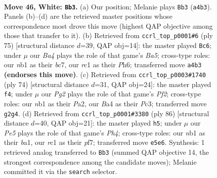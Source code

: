 \documentclass[11pt]{article}
\begin{document}
\clearpage

\begin{figure}[p]\centering
\begin{subfigure}{0.46\textwidth}\centering
\resizebox{\linewidth}{!}{%
\newchessgame
\chessboard[
  setfen={6k1/1b3p1p/6p1/4Pp2/B4P2/7N/P4KPP/1nr5 w - - 0 46},
  showmover=false,
  pgfstyle=straightmove, color=movearrow, markmove={a4-b3}
]}
\caption{}
\end{subfigure}\hfill
\begin{subfigure}{0.46\textwidth}\centering
\resizebox{\linewidth}{!}{%
\newchessgame
\chessboard[
  setfen={6k1/2B2p2/5n1p/3p2p1/b1pP4/2P1NP1P/6P1/6K1 b - - 0 38},
  showmover=false,
  pgfstyle=straightmove, color=movearrow, markmove={a4-c6}
]}
\caption{}
\end{subfigure}
\\[4pt]
\begin{subfigure}{0.46\textwidth}\centering
\resizebox{\linewidth}{!}{%
\newchessgame
\chessboard[
  setfen={8/bp4pk/5p1p/8/p5P1/2PN2P1/P3KP2/8 w - - 2 38},
  showmover=false,
  pgfstyle=straightmove, color=movearrow, markmove={f2-f4}
]}
\caption{}
\end{subfigure}\hfill
\begin{subfigure}{0.46\textwidth}\centering
\resizebox{\linewidth}{!}{%
\newchessgame
\chessboard[
  setfen={1r4k1/5pp1/7p/8/7P/1P2N1P1/2B1PP2/b5K1 w - - 0 44},
  showmover=false,
  pgfstyle=straightmove, color=movearrow, markmove={h4-h5}
]}
\caption{}
\end{subfigure}
\caption{\textbf{Move 46, White: \texttt{Bb3}.} (a) Our position; Melanie plays \texttt{Bb3} (\texttt{a4b3}). Panels (b)--(d) are the retrieved master positions whose correspondence most drove this move (highest QAP objective among those that transfer to it). (b) Retrieved from \texttt{ccrl\_top\_p0001\#6} (ply 75) [structural distance $d$=39, QAP obj=14]: the master played \texttt{Bc6}; under $\mu$ our \emph{Ba4} plays the role of that game's \emph{Ba5}; cross-type roles: our \emph{n}b1 as their \emph{b}c7, our \emph{r}c1 as their \emph{P}h6; transferred move \texttt{a4b3} \textbf{(endorses this move)}. (c) Retrieved from \texttt{ccrl\_top\_p0003\#1740} (ply 74) [structural distance $d$=31, QAP obj=24]: the master played \texttt{f4}; under $\mu$ our \emph{Pg2} plays the role of that game's \emph{Pf2}; cross-type roles: our \emph{n}b1 as their \emph{P}a2, our \emph{B}a4 as their \emph{P}c3; transferred move \texttt{g2g4}. (d) Retrieved from \texttt{ccrl\_top\_p0001\#3380} (ply 86) [structural distance $d$=40, QAP obj=21]: the master played \texttt{h5}; under $\mu$ our \emph{Pe5} plays the role of that game's \emph{Ph4}; cross-type roles: our \emph{n}b1 as their \emph{b}a1, our \emph{r}c1 as their \emph{p}f7; transferred move \texttt{e5e6}. Synthesis: 1 retrieved analog transferred to \texttt{Bb3} (summed QAP objective 14, the strongest correspondence among the candidate moves); Melanie committed it via the \texttt{search} selector.}
\label{fig:thought-m90}
\end{figure}
\end{document}
